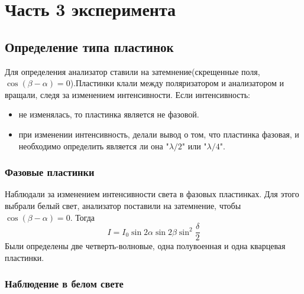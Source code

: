 
\section{Часть 3 эксперимента}
\subsection{Определение типа пластинок}
Для определения анализатор ставили на затемнение(скрещенные поля, $\cos(\beta-\alpha)=0$).Пластинки клали между поляризатором и анализатором и вращали, следя за изменением интенсивности. Если интенсивность:
\begin{itemize}
	\item не изменялась, то пластинка является не фазовой.
	\item при изменении интенсивность, делали вывод о том, что пластинка фазовая, и необходимо определить является ли она "$ \lambda/2 $" или "$ \lambda/4 $".
\end{itemize}
\subsubsection{Фазовые пластинки}
Наблюдали за изменением интенсивности света в фазовых пластинках. Для этого выбрали белый свет, анализатор поставили на затемнение, чтобы $\cos(\beta-\alpha)=0$. Тогда
\begin{equation}
	I=I_0\sin2\alpha\sin2\beta\sin^2\frac{\delta}{2}
	\label{eq:2}
\end{equation}
Были определены две четверть-волновые, одна полувоенная и одна кварцевая пластинки. 
\subsubsection{Наблюдение в белом свете}


